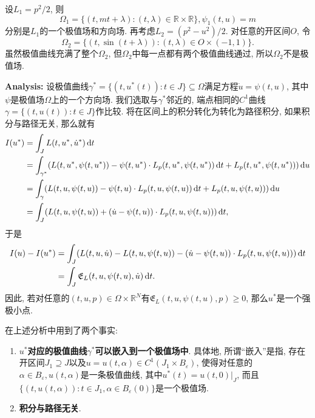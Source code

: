 \begin{example}
    设$L_1 = p^2/2$, 则
    \begin{equation*}
        \Omega_1 = \{(t, mt + \lambda)\colon (t, \lambda) \in \mathbb{R} \times \mathbb{R}\}, \psi_1(t, u) = m
    \end{equation*}
    分别是$L_1$的一个极值场和方向场. 再考虑$L_2 = (p^2 - u^2)/2$. 对任意的开区间$O$, 令 
    \begin{equation*}
        \Omega_2 = \{(t, \sin(t + \lambda))\colon (t, \lambda) \in O \times (-1, 1)\}.
    \end{equation*}
    虽然极值曲线充满了整个$\Omega_2$, 但$\Omega_2$中每一点都有两个极值曲线通过, 所以$\Omega_2$不是极值场.
\end{example}

\textbf{Analysis:} 设极值曲线$\gamma^* = \{(t, u^*(t))\colon t \in J\} \subseteq \Omega$满足方程$\dot u = \psi(t, u)$, 其中$\psi$是极值场$\Omega$上的一个方向场.
我们选取与$\gamma^*$邻近的, 端点相同的$C^1$曲线$\gamma = \{(t, u(t))\colon t \in J\}$作比较.
将在区间上的积分转化为转化为路径积分, 如果积分与路径无关, 那么就有
\begin{align*} 
    I(u^*) &= \int_JL(t, u^*, \dot u^*) \,{\rm d}t \\ 
    &= \int_{\gamma^*}(L(t, u^*, \psi(t, u^*)) - \psi(t, u^*)\cdot L_p(t, u^*, \psi(t, u^*)) \,{\rm d}t + L_p(t, u^*, \psi(t, u^*))) \,{\rm d}u \\  
    &= \int_{\gamma}(L(t, u, \psi(t, u)) - \psi(t, u)\cdot L_p(t, u, \psi(t, u)) \,{\rm d}t + L_p(t, u, \psi(t, u))) \,{\rm d}u \\  
    &= \int_J(L(t, u, \psi(t, u)) + (\dot u - \psi(t, u))\cdot L_p(t, u, \psi(t, u))) \,{\rm d}t, 
\end{align*}
于是 
\begin{align*}
    I(u) - I(u^*) &= \int_J(L(t, u, \dot u) - L(t, u, \psi(t, u)) - (\dot u - \psi(t, u))\cdot L_p(t, u, \psi(t, u))) \,{\rm d}t \\  
    &= \int_J\mathfrak{E}_L(t, u, \psi(t, u), \dot u) \,{\rm d}t.
\end{align*} 
因此, 若对任意的$(t, u, p) \in \Omega \times  \mathbb{R}^N$有$\mathfrak{E}_L(t, u, \psi(t, u), p) \geq 0$, 那么$u^*$是一个强极小点.

在上述分析中用到了两个事实:

\begin{enumerate}
    \item \textbf{$u^*$对应的极值曲线$\gamma^*$可以嵌入到一个极值场中}. 具体地, 所谓``嵌入''是指, 存在开区间$J_1 \supseteq J$以及$u = u(t, \alpha) \in C^1(J_1 \times B_{\varepsilon})$, 使得对任意的$\alpha \in B_{\varepsilon}, u(t, \alpha)$是一条极值曲线, 其中$u^*(t) = u(t, 0)|_J$,
    而且$\{(t, u(t, \alpha))\colon t \in J_1, \alpha \in B_{\varepsilon}(0)\}$是一个极值场.
    \item \textbf{积分与路径无关}.
\end{enumerate}

